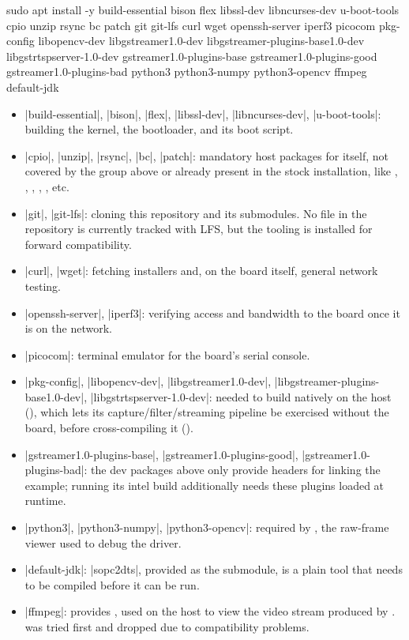 \begin{shellcodehost}
sudo apt install -y build-essential bison flex libssl-dev libncurses-dev u-boot-tools cpio unzip 
    rsync bc patch git git-lfs curl wget openssh-server iperf3 picocom pkg-config libopencv-dev 
    libgstreamer1.0-dev libgstreamer-plugins-base1.0-dev libgstrtspserver-1.0-dev 
    gstreamer1.0-plugins-base gstreamer1.0-plugins-good gstreamer1.0-plugins-bad 
    python3 python3-numpy python3-opencv ffmpeg default-jdk
\end{shellcodehost}

\begin{itemize}
    \item |build-essential|, |bison|, |flex|, |libssl-dev|, |libncurses-dev|, |u-boot-tools|: building the  kernel, the  bootloader, and its boot script.
    \item |cpio|, |unzip|, |rsync|, |bc|, |patch|: mandatory host packages for  itself, not covered by the group above or already present in the stock  installation, like , , , , , etc.
    \item |git|, |git-lfs|: cloning this repository and its submodules. No file in the repository is currently tracked with LFS, but the tooling is installed for forward compatibility.
    \item |curl|, |wget|: fetching installers and, on the board itself, general network testing.
    \item |openssh-server|, |iperf3|: verifying  access and bandwidth to the board once it is on the network.
    \item |picocom|: terminal emulator for the board's serial console.
    \item |pkg-config|, |libopencv-dev|, |libgstreamer1.0-dev|, |libgstreamer-plugins-base1.0-dev|, |libgstrtspserver-1.0-dev|: needed to build  natively on the host (), which lets its capture/filter/streaming pipeline be exercised without the board, before cross-compiling it ().
    \item |gstreamer1.0-plugins-base|, |gstreamer1.0-plugins-good|, |gstreamer1.0-plugins-bad|: the dev packages above only provide headers for linking the  example; running its intel build additionally needs these plugins loaded at runtime.
    \item |python3|, |python3-numpy|, |python3-opencv|: required by , the raw-frame viewer used to debug the  driver.
    \item |default-jdk|: |sopc2dts|, provided as the  submodule, is a plain  tool that needs to be compiled before it can be run.
    \item |ffmpeg|: provides , used on the host to view the  video stream produced by .  was tried first and dropped due to compatibility problems.
\end{itemize}

